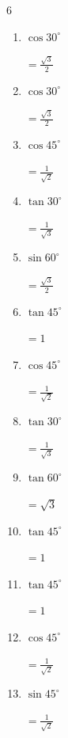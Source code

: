 \begin{multicols}{6}
\begin{enumerate}
  \item $\displaystyle \cos{30^\circ}$

        $\displaystyle =\frac{\sqrt{3}}{2}$

  \item $\displaystyle \cos{30^\circ}$

        $\displaystyle =\frac{\sqrt{3}}{2}$

  \item $\displaystyle \cos{45^\circ}$

        $\displaystyle =\frac{1}{\sqrt{2}}$

  \item $\displaystyle \tan{30^\circ}$

        $\displaystyle =\frac{1}{\sqrt{3}}$

  \item $\displaystyle \sin{60^\circ}$

        $\displaystyle =\frac{\sqrt{3}}{2}$

  \item $\displaystyle \tan{45^\circ}$

        $\displaystyle =1$

  \item $\displaystyle \cos{45^\circ}$

        $\displaystyle =\frac{1}{\sqrt{2}}$

  \item $\displaystyle \tan{30^\circ}$

        $\displaystyle =\frac{1}{\sqrt{3}}$

  \item $\displaystyle \tan{60^\circ}$

        $\displaystyle =\sqrt{3}$

\columnbreak %

  \item $\displaystyle \tan{45^\circ}$

        $\displaystyle =1$

  \item $\displaystyle \tan{45^\circ}$

        $\displaystyle =1$

  \item $\displaystyle \cos{45^\circ}$

        $\displaystyle =\frac{1}{\sqrt{2}}$

  \item $\displaystyle \sin{45^\circ}$

        $\displaystyle =\frac{1}{\sqrt{2}}$


\end{enumerate}
\end{multicols}
